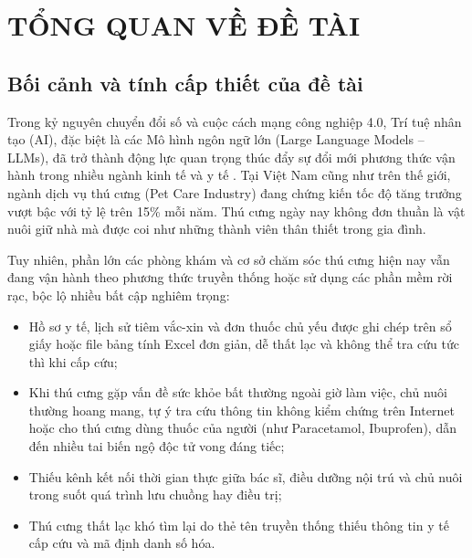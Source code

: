 
\chapter{TỔNG QUAN VỀ ĐỀ TÀI}
\label{chap:tongquan}

\section{Bối cảnh và tính cấp thiết của đề tài}
\label{sec:boicanh}

Trong kỷ nguyên chuyển đổi số và cuộc cách mạng công nghiệp 4.0, Trí tuệ nhân tạo (AI), đặc biệt là các Mô hình ngôn ngữ lớn (Large Language Models -- LLMs), đã trở thành động lực quan trọng thúc đẩy sự đổi mới phương thức vận hành trong nhiều ngành kinh tế và y tế \cite{goodfellow2016deeplearning,achiam2023gpt4}. Tại Việt Nam cũng như trên thế giới, ngành dịch vụ thú cưng (Pet Care Industry) đang chứng kiến tốc độ tăng trưởng vượt bậc với tỷ lệ trên 15\% mỗi năm. Thú cưng ngày nay không đơn thuần là vật nuôi giữ nhà mà được coi như những thành viên thân thiết trong gia đình.

Tuy nhiên, phần lớn các phòng khám và cơ sở chăm sóc thú cưng hiện nay vẫn đang vận hành theo phương thức truyền thống hoặc sử dụng các phần mềm rời rạc, bộc lộ nhiều bất cập nghiêm trọng:
\begin{itemize}[leftmargin=1.5cm]
    \item Hồ sơ y tế, lịch sử tiêm vắc-xin và đơn thuốc chủ yếu được ghi chép trên sổ giấy hoặc file bảng tính Excel đơn giản, dễ thất lạc và không thể tra cứu tức thì khi cấp cứu;
    \item Khi thú cưng gặp vấn đề sức khỏe bất thường ngoài giờ làm việc, chủ nuôi thường hoang mang, tự ý tra cứu thông tin không kiểm chứng trên Internet hoặc cho thú cưng dùng thuốc của người (như Paracetamol, Ibuprofen), dẫn đến nhiều tai biến ngộ độc tử vong đáng tiếc;
    \item Thiếu kênh kết nối thời gian thực giữa bác sĩ, điều dưỡng nội trú và chủ nuôi trong suốt quá trình lưu chuồng hay điều trị;
    \item Thú cưng thất lạc khó tìm lại do thẻ tên truyền thống thiếu thông tin y tế cấp cứu và mã định danh số hóa.
\end{itemize}

